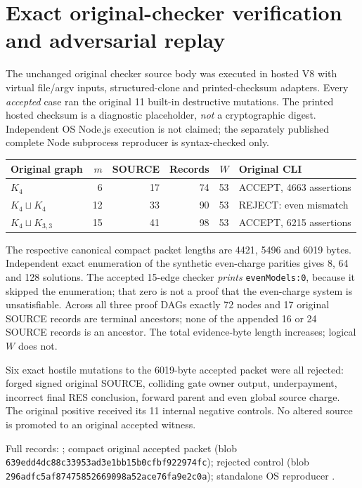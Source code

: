 \documentclass[11pt]{article}
\begin{document}
\section{Exact original-checker verification and adversarial replay}
The unchanged original checker source body was executed in hosted V8 with virtual file/argv inputs, structured-clone and printed-checksum adapters. Every \emph{accepted} case ran the original 11 built-in destructive mutations. The printed hosted checksum is a diagnostic placeholder, \emph{not} a cryptographic digest. Independent OS Node.js execution is not claimed; the separately published complete Node subprocess reproducer is syntax-checked only.
\begin{center}
\begin{tabular}{lrrrrl}
\toprule
Original graph & $m$ & SOURCE & Records & $W$ & Original CLI\\\midrule
$K_4$ & 6 & 17 & 74 & 53 & ACCEPT, 4663 assertions\\
$K_4\sqcup K_4$ & 12 & 33 & 90 & 53 & REJECT: even mismatch\\
$K_4\sqcup K_{3,3}$ & 15 & 41 & 98 & 53 & ACCEPT, 6215 assertions\\\bottomrule
\end{tabular}
\end{center}
The respective canonical compact packet lengths are 4421, 5496 and 6019 bytes. Independent exact enumeration of the synthetic even-charge parities gives 8, 64 and 128 solutions. The accepted 15-edge checker \emph{prints} \texttt{evenModels:0}, because it skipped the enumeration; that zero is not a proof that the even-charge system is unsatisfiable. Across all three proof DAGs exactly 72 nodes and 17 original SOURCE records are terminal ancestors; none of the appended 16 or 24 SOURCE records is an ancestor. The total evidence-byte length increases; logical $W$ does not.
\par
Six exact hostile mutations to the 6019-byte accepted packet were all rejected: forged signed original SOURCE, colliding gate owner output, underpayment, incorrect final RES conclusion, forward parent and even global source charge. The original positive received its 11 internal negative controls. No altered source is promoted to an original accepted witness.
\par
Full records: ; compact original accepted packet  (blob \texttt{639edd4dc88c33953ad3e1bb15b0cfbf922974fc}); rejected control  (blob \texttt{296adfc5af87475852669098a52ace76fa9e2c0a}); standalone OS reproducer .
\end{document}
